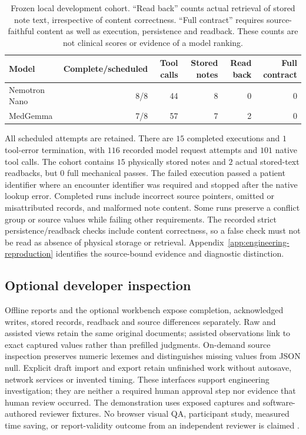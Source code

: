 \begin{table}[t]
\centering
\small
\begin{tabular}{lrrrrr}
\toprule
Model & Complete/scheduled & Tool calls & Stored notes & Read back & Full contract \\
\midrule
Nemotron Nano & 8/8 & 44 & 8 & 0 & 0 \\ %
MedGemma & 7/8 & 57 & 7 & 2 & 0 \\ %
\bottomrule
\end{tabular}
\caption{Frozen local development cohort. ``Read back'' counts actual retrieval
of stored note text, irrespective of content correctness. ``Full contract''
requires source-faithful content as well as execution, persistence and readback.
These counts are not clinical scores or evidence of a model ranking.}
\label{tab:local-engineering}
\end{table}

All scheduled attempts are retained. There are $15$ completed executions %
and $1$ tool-error termination, %
with $116$ recorded model request attempts %
and $101$ native tool calls. %
The cohort contains $15$ physically stored notes %
and $2$ actual stored-text readbacks, %
but $0$ full mechanical passes. %
The failed execution passed a patient identifier where an encounter identifier
was required and stopped after the native lookup error. Completed runs include
incorrect source pointers, omitted or misattributed records, and malformed
note content. Some runs preserve a conflict group or source values while
failing other requirements. The recorded strict persistence/readback checks
include content correctness, so a false check must not be read as absence of
physical storage or retrieval. Appendix~\ref{app:engineering-reproduction}
identifies the source-bound evidence and diagnostic distinction.

\subsection{Optional developer inspection}
Offline reports and the optional workbench expose completion, acknowledged
writes, stored records, readback and source differences separately. Raw and
assisted views retain the same original documents; assisted observations link
to exact captured values rather than prefilled judgments. On-demand source
inspection preserves numeric lexemes and distinguishes missing values from
JSON null. Explicit draft import and export retain unfinished work without
autosave, network services or invented timing. These interfaces support
engineering investigation; they are neither a required human approval step
nor evidence that human review occurred. The demonstration uses exposed
captures and software-authored reviewer fixtures. No browser visual QA,
participant study, measured time saving, or report-validity outcome from an
independent reviewer is claimed \citep{healthcraft_workbench2026}.

